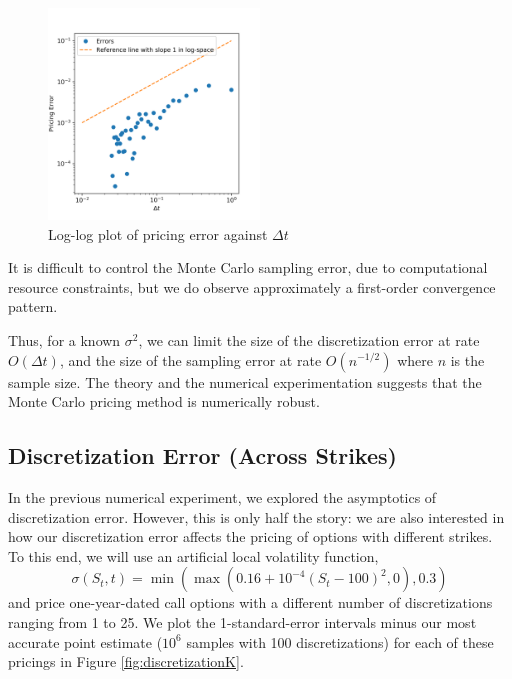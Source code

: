 \documentclass[12pt]{article}
\numberwithin{equation}{section}
\begin{document}
\begin{figure}[h!]
    \centering
    \includegraphics[width=0.5\textwidth]{figs/montecarlo_discrete.png}
    \caption{Log-log plot of pricing error against $\Delta t$}
    \label{fig:log-log}
\end{figure}

It is difficult to control the Monte Carlo sampling error, due to computational
resource constraints, but we do observe approximately a first-order convergence
pattern. 
  
Thus, for a known $\sigma^2$, we can limit the size of the discretization error
at rate $O(\Delta t)$, and the size of the sampling error at rate $O(n^{-1/2})$
where $n$ is the sample size. The theory and the numerical experimentation
suggests that the Monte Carlo pricing method is numerically robust. 

\subsection{Discretization Error (Across Strikes)}

In the previous numerical experiment, we explored the asymptotics of
discretization error. However, this is only half the story: we are also
interested in how our discretization error affects the pricing of options with
different strikes. To this end, we will use an artificial local volatility
function,
\[ \sigma(S_t, t) = \min(\max(0.16 + 10^{-4}(S_t - 100)^2, 0), 0.3) \]
and price one-year-dated call options with a different number of discretizations
ranging from 1 to 25. We plot the 1-standard-error intervals minus our most
accurate point estimate ($10^6$ samples with 100 discretizations) for each of
these pricings in Figure \ref{fig:discretizationK}.
\end{document}

